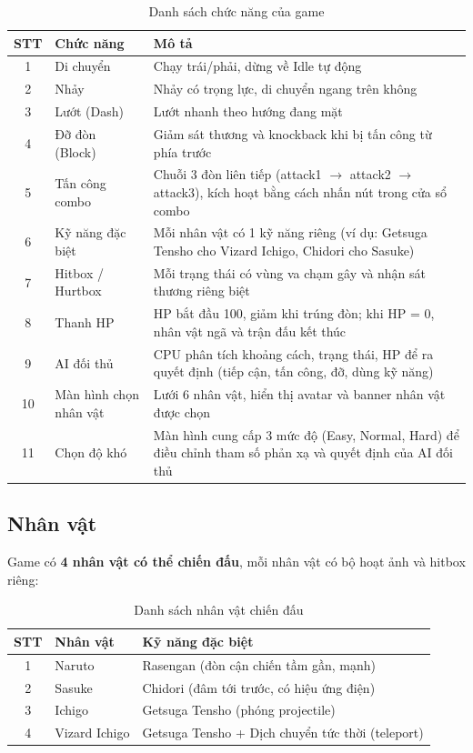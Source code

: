 \documentclass[a4paper,12pt]{report}
\begin{document}
\begin{table}[H]
\centering
\caption{Danh sách chức năng của game}
\begin{tabular}{c p{4cm} p{8cm}}
\toprule
\textbf{STT} & \textbf{Chức năng} & \textbf{Mô tả} \\
\midrule
1 & Di chuyển & Chạy trái/phải, dừng về Idle tự động \\
2 & Nhảy & Nhảy có trọng lực, di chuyển ngang trên không \\
3 & Lướt (Dash) & Lướt nhanh theo hướng đang mặt \\
4 & Đỡ đòn (Block) & Giảm sát thương và knockback khi bị tấn công từ phía trước \\
5 & Tấn công combo & Chuỗi 3 đòn liên tiếp (attack1 $\to$ attack2 $\to$ attack3), kích hoạt bằng cách nhấn nút trong cửa sổ combo \\
6 & Kỹ năng đặc biệt & Mỗi nhân vật có 1 kỹ năng riêng (ví dụ: Getsuga Tensho cho Vizard Ichigo, Chidori cho Sasuke) \\
7 & Hitbox / Hurtbox & Mỗi trạng thái có vùng va chạm gây và nhận sát thương riêng biệt \\
8 & Thanh HP & HP bắt đầu 100, giảm khi trúng đòn; khi HP = 0, nhân vật ngã và trận đấu kết thúc \\
9 & AI đối thủ & CPU phân tích khoảng cách, trạng thái, HP để ra quyết định (tiếp cận, tấn công, đỡ, dùng kỹ năng) \\
10 & Màn hình chọn nhân vật & Lưới 6 nhân vật, hiển thị avatar và banner nhân vật được chọn \\
11 & Chọn độ khó & Màn hình cung cấp 3 mức độ (Easy, Normal, Hard) để điều chỉnh tham số phản xạ và quyết định của AI đối thủ \\
\bottomrule
\end{tabular}
\end{table}

\subsection{Nhân vật}

Game có \textbf{4 nhân vật có thể chiến đấu}, mỗi nhân vật có bộ hoạt ảnh và hitbox riêng:

\begin{table}[H]
\centering
\caption{Danh sách nhân vật chiến đấu}
\begin{tabular}{c l l}
\toprule
\textbf{STT} & \textbf{Nhân vật} & \textbf{Kỹ năng đặc biệt} \\
\midrule
1 & Naruto & Rasengan (đòn cận chiến tầm gần, mạnh) \\
2 & Sasuke & Chidori (đâm tới trước, có hiệu ứng điện) \\
3 & Ichigo & Getsuga Tensho (phóng projectile) \\
4 & Vizard Ichigo & Getsuga Tensho + Dịch chuyển tức thời (teleport) \\
\bottomrule
\end{tabular}
\end{table}
\end{document}
